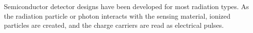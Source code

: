 \documentclass[../../../../main.tex]{subfiles}
\begin{document}
%
    \Xsubsubsection%
    Semiconductor detector designs have been developed for most radiation types.
    As the radiation particle or photon interacts with the sensing material, ionized particles are created, and the charge carriers are read as electrical pulses.
\end{document}
